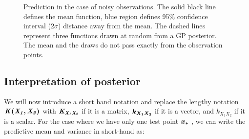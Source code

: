 \begin{figure}[!ht]
  \centering
    \quad
{}\quad
  
       \caption{Prediction in the case of noisy observations. The solid black line defines the mean function, blue region defines 95\% confidence interval (2$\sigma$) distance away from the mean. The dashed lines represent three functions drawn at random from a GP posterior. The mean and the draws do not pass exactly from the observation points.}
       \label{figGPNoisyPosteriors}
\end{figure}

\subsection{Interpretation of posterior}
We will now introduce a short hand notation and replace the lengthy notation $\bm{\mathit{K(X_1, X_2)}}$ with $\bm{\mathit{K_{X_1 X_2}}}$ if it is a matrix, $\boldsymbol{k_{X_1 X_2}}$ if it is a vector, and $k_{X_1 X_2}$ if it is a scalar. For the case where we have only one test point $\boldsymbol{x_{*}}$ , we can write the predictive mean and variance in short-hand as:

